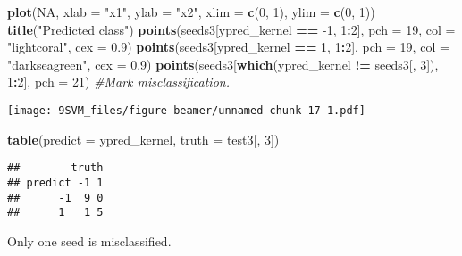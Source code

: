 \documentclass[10pt,ignorenonframetext,]{beamer}
\newenvironment{Shaded}{\begin{snugshade}}{\end{snugshade}}
\newcommand{\KeywordTok}[1]{\textcolor[rgb]{0.13,0.29,0.53}{\textbf{#1}}}
\newcommand{\DataTypeTok}[1]{\textcolor[rgb]{0.13,0.29,0.53}{#1}}
\newcommand{\DecValTok}[1]{\textcolor[rgb]{0.00,0.00,0.81}{#1}}
\newcommand{\FloatTok}[1]{\textcolor[rgb]{0.00,0.00,0.81}{#1}}
\newcommand{\StringTok}[1]{\textcolor[rgb]{0.31,0.60,0.02}{#1}}
\newcommand{\CommentTok}[1]{\textcolor[rgb]{0.56,0.35,0.01}{\textit{#1}}}
\newcommand{\OtherTok}[1]{\textcolor[rgb]{0.56,0.35,0.01}{#1}}
\newcommand{\OperatorTok}[1]{\textcolor[rgb]{0.81,0.36,0.00}{\textbf{#1}}}
\newcommand{\NormalTok}[1]{#1}
\begin{document}
\begin{frame}[fragile]

\begin{Shaded}
\begin{Highlighting}[]
\KeywordTok{plot}\NormalTok{(}\OtherTok{NA}\NormalTok{, }\DataTypeTok{xlab =} \StringTok{"x1"}\NormalTok{, }\DataTypeTok{ylab =} \StringTok{"x2"}\NormalTok{, }\DataTypeTok{xlim =} \KeywordTok{c}\NormalTok{(}\DecValTok{0}\NormalTok{, }\DecValTok{1}\NormalTok{), }\DataTypeTok{ylim =} \KeywordTok{c}\NormalTok{(}\DecValTok{0}\NormalTok{, }\DecValTok{1}\NormalTok{))}
\KeywordTok{title}\NormalTok{(}\StringTok{"Predicted class"}\NormalTok{)}
\KeywordTok{points}\NormalTok{(seeds3[ypred_kernel }\OperatorTok{==}\StringTok{ }\DecValTok{-1}\NormalTok{, }\DecValTok{1}\OperatorTok{:}\DecValTok{2}\NormalTok{], }\DataTypeTok{pch =} \DecValTok{19}\NormalTok{, }\DataTypeTok{col =} \StringTok{"lightcoral"}\NormalTok{, }
    \DataTypeTok{cex =} \FloatTok{0.9}\NormalTok{)}
\KeywordTok{points}\NormalTok{(seeds3[ypred_kernel }\OperatorTok{==}\StringTok{ }\DecValTok{1}\NormalTok{, }\DecValTok{1}\OperatorTok{:}\DecValTok{2}\NormalTok{], }\DataTypeTok{pch =} \DecValTok{19}\NormalTok{, }\DataTypeTok{col =} \StringTok{"darkseagreen"}\NormalTok{, }
    \DataTypeTok{cex =} \FloatTok{0.9}\NormalTok{)}
\KeywordTok{points}\NormalTok{(seeds3[}\KeywordTok{which}\NormalTok{(ypred_kernel }\OperatorTok{!=}\StringTok{ }\NormalTok{seeds3[, }\DecValTok{3}\NormalTok{]), }\DecValTok{1}\OperatorTok{:}\DecValTok{2}\NormalTok{], }\DataTypeTok{pch =} \DecValTok{21}\NormalTok{)  }\CommentTok{#Mark misclassification.}
\end{Highlighting}
\end{Shaded}

\texttt{[image: 9SVM\_files/figure-beamer/unnamed-chunk-17-1.pdf]}

\begin{Shaded}
\begin{Highlighting}[]
\KeywordTok{table}\NormalTok{(}\DataTypeTok{predict =}\NormalTok{ ypred_kernel, }\DataTypeTok{truth =}\NormalTok{ test3[, }\DecValTok{3}\NormalTok{])}
\end{Highlighting}
\end{Shaded}

\begin{verbatim}
##        truth
## predict -1 1
##      -1  9 0
##      1   1 5
\end{verbatim}

Only one seed is misclassified.

\end{frame}
\end{document}
